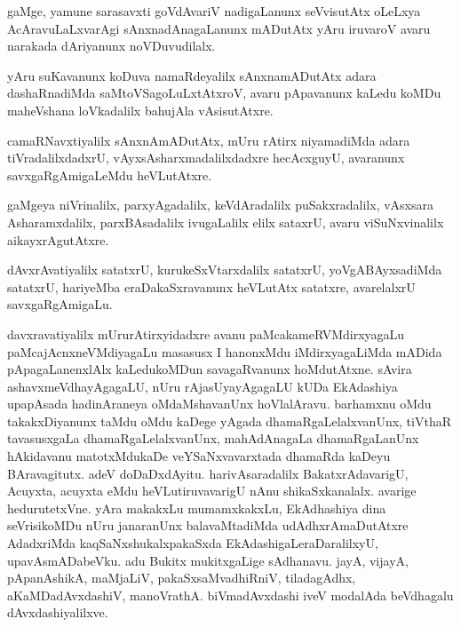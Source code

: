 \documentclass{article}
\begin{document}
\begin{mn}%
gaMge, yamune sarasavxti goVdAvariV nadigaLanunx seVvisutAtx oLeLxya AcAravuLaLxvarAgi 
sAnxnadAnagaLanunx mADutAtx yAru iruvaroV avaru narakada dAriyanunx noVDuvudilalx.
\end{mn}

\begin{mn}%
yAru suKavanunx koDuva namaRdeyalilx sAnxnamADutAtx adara dashaRnadiMda 
saMtoVSagoLuLxtAtxroV, avaru pApavanunx kaLedu koMDu maheVshana loVkadalilx bahujAla 
vAsisutAtxre.
\end{mn}

\begin{mn}%
camaRNavxtiyalilx sAnxnAmADutAtx, mUru rAtirx niyamadiMda adara tiVradalilxdadxrU, 
vAyxsAsharxmadalilxdadxre hecAcxguyU, avaranunx savxgaRgAmigaLeMdu heVLutAtxre.
\end{mn}

\begin{mn}%
gaMgeya niVrinalilx, parxyAgadalilx, keVdAradalilx puSakxradalilx, vAsxsara 
Asharamxdalilx, parxBAsadalilx ivugaLalilx elilx sataxrU, avaru viSuNxvinalilx 
aikayxrAgutAtxre.
\end{mn}

\begin{mn}%
dAvxrAvatiyalilx satatxrU, kurukeSxVtarxdalilx satatxrU, yoVgABAyxsadiMda satatxrU, 
hariyeMba eraDakaSxravanunx heVLutAtx satatxre, avarelalxrU savxgaRgAmigaLu.
\end{mn}

\begin{mn}%
davxravatiyalilx mUrurAtirxyidadxre avanu paMcakameRVMdirxyagaLu paMcajAcnxneVMdiyagaLu 
masasusx I hanonxMdu iMdirxyagaLiMda mADida pApagaLanenxlAlx kaLedukoMDun savagaRvanunx 
hoMdutAtxne. sAvira ashavxmeVdhayAgagaLU, nUru rAjasUyayAgagaLU kUDa EkAdashiya upapAsada 
hadinAraneya oMdaMshavanUnx hoVlalAravu. barhamxnu oMdu takakxDiyanunx taMdu oMdu kaDege 
yAgada dhamaRgaLelalxvanUnx, tiVthaR tavasusxgaLa dhamaRgaLelalxvanUnx, mahAdAnagaLa 
dhamaRgaLanUnx hAkidavanu matotxMdukaDe veYSaNxvavarxtada dhamaRda kaDeyu BAravagitutx. 
adeV doDaDxdAyitu. harivAsaradalilx BakatxrAdavarigU, Acuyxta, acuyxta eMdu 
heVLutiruvavarigU nAnu shikaSxkanalalx. avarige hedurutetxVne. yAra makakxLu 
mumamxkakxLu, EkAdhashiya dina seVrisikoMDu nUru janaranUnx balavaMtadiMda 
udAdhxrAmaDutAtxre AdadxriMda kaqSaNxshukalxpakaSxda EkAdashigaLeraDaralilxyU, 
upavAsmADabeVku. adu Bukitx mukitxgaLige sAdhanavu. jayA, vijayA, pApanAshikA, maMjaLiV, 
pakaSxsaMvadhiRniV, tiladagAdhx, aKaMDadAvxdashiV, manoVrathA. biVmadAvxdashi iveV 
modalAda beVdhagalu dAvxdashiyalilxve.
\end{mn}
\end{document}
